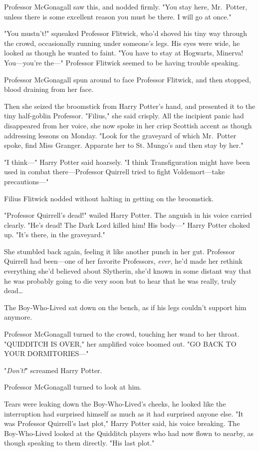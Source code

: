 Professor McGonagall saw this, and nodded firmly. "You stay here, Mr.~Potter,
unless there is some excellent reason you must be there. I will go at once."

"You mustn't!" squeaked Professor Flitwick, who'd shoved his tiny way through
the crowd, occasionally running under someone's legs. His eyes were wide, he
looked as though he wanted to faint. "You have to stay at Hogwarts, Minerva!
You---you're the---" Professor Flitwick seemed to be having trouble speaking.

Professor McGonagall spun around to face Professor Flitwick, and then stopped,
blood draining from her face.

Then she seized the broomstick from Harry Potter's hand, and presented it to
the tiny half-goblin Professor. "Filius," she said crisply. All the incipient
panic had disappeared from her voice, she now spoke in her crisp Scottish
accent as though addressing lessons on Monday. "Look for the graveyard of which
Mr.~Potter spoke, find Miss Granger. Apparate her to St. Mungo's and then stay
by her."

"I think---" Harry Potter said hoarsely. "I think Transfiguration might have
been used in combat there---Professor Quirrell tried to fight Voldemort---take
precautions---"

Filius Flitwick nodded without halting in getting on the broomstick.

"Professor Quirrell's dead!" wailed Harry Potter. The anguish in his voice
carried clearly. "He's dead! The Dark Lord killed him! His body---" Harry
Potter choked up. "It's there, in the graveyard."

She stumbled back again, feeling it like another punch in her gut. Professor
Quirrell had been---one of her favorite Professors, \emph{ever}, he'd made her
rethink everything she'd believed about Slytherin, she'd known in some distant
way that he was probably going to die very soon but to hear that he was really,
truly dead{\ldots}

The Boy-Who-Lived sat down on the bench, as if his legs couldn't support him
anymore.

Professor McGonagall turned to the crowd, touching her wand to her throat.
"QUIDDITCH IS OVER," her amplified voice boomed out. "GO BACK TO YOUR
DORMITORIES---"

"\emph{Don't!}" screamed Harry Potter.

Professor McGonagall turned to look at him.

Tears were leaking down the Boy-Who-Lived's cheeks, he looked like the
interruption had surprised himself as much as it had surprised anyone else. "It
was Professor Quirrell's last plot," Harry Potter said, his voice breaking. The
Boy-Who-Lived looked at the Quidditch players who had now flown to nearby, as
though speaking to them directly. "His last plot."

